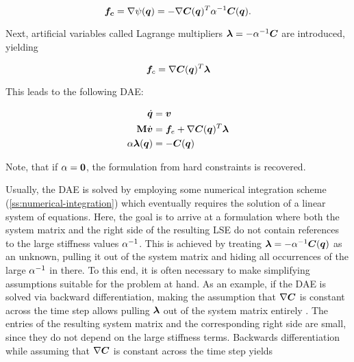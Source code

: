 \begin{equation}\label{eq:compliant-force}
    \bm{f_c} = \nabla \psi(\bm{q}) = -\nabla \bm{C}(\bm{q})^T\mathbf{\alpha}^{-1} \bm{C}(\bm{q}).
\end{equation}

\noindent Next, artificial variables called Lagrange multipliers $\bm{\lambda} = -\mathbf{\alpha}^{-1}\bm{C}$ are introduced, yielding 

\begin{equation}\label{eq:compliant-force-lambda}
    \bm{f}_c = \nabla \bm{C}(\bm{q})^T\bm{\lambda}
\end{equation}

\noindent This leads to the following DAE:

\begin{equation}\label{eq:compliant-dae}
\begin{split}
    \dot{\bm{q}} &= \bm{v} \\
    \mathbf{M}\dot{\bm{v}} &= \bm{f}_{e} + \nabla \bm{C}(\bm{q})^T\bm{\lambda} \\
    \mathbf{\alpha}\bm{\lambda}(\bm{q}) &= -\bm{C}(\bm{q})
\end{split}
\end{equation}

\noindent Note, that if $\mathbf{\alpha} = \mathbf{0}$, the formulation from hard constraints is recovered. 

Usually, the DAE is solved by employing some numerical integration scheme (\cref{ss:numerical-integration}) which eventually requires 
the solution of a linear system of equations. Here, the goal is to arrive at a formulation where both the system matrix and the right 
side of the resulting LSE do not contain references to the large stiffness values
$\mathbf{\alpha}^{-1}$. This is achieved by treating $\bm{\lambda} = -\mathbf{\alpha}^{-1}\bm{C}(\bm{q})$ as an unknown, 
pulling it out of the system matrix and hiding all occurrences of the large $\mathbf{\alpha}^{-1}$ in there. To this end, it is often 
necessary to make simplifying assumptions suitable for the problem at hand. As an example, if the DAE is solved via backward 
differentiation, making the assumption that $\nabla \bm{C}$ is constant across the time step allows pulling $\bm{\lambda}$ out of 
the system matrix entirely \cite{tournier2015}. The entries of the resulting system matrix and the corresponding right side
are small, since they do not depend on the large stiffness terms. Backwards differentiation while assuming that $\nabla \bm{C}$ is 
constant across the time step yields

